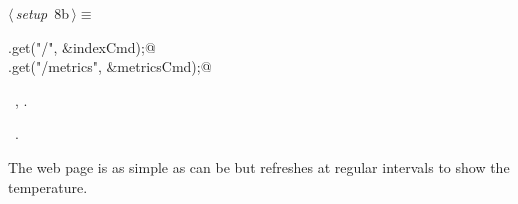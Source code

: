 \documentclass[a4paper, 11pt]{article}
\begin{document}
\begin{flushleft} \small
\begin{minipage}{\linewidth}\label{scrap10}\raggedright\small
{}$\langle\,${\itshape setup}\nobreak\ {\footnotesize{8b}}$\,\rangle\equiv$
\vspace{-1ex}
\begin{list}{}{\setlength{\leftmargin}{1em}} \item
\mbox{}\lstinline@app.get("/", &indexCmd);@\\
\mbox{}\lstinline@app.get("/metrics", &metricsCmd);@\\
\mbox{}{\NWsep}
\end{list}
\vspace{-1ex}
\vspace{-1ex}
\footnotesize
\begin{list}{}{\setlength{\itemsep}{-\parsep}\setlength{\itemindent}{-\leftmargin}}
\item \NWtxtMacroDefBy\ , .
\item \NWtxtMacroRefIn\ .
\end{list}
\end{minipage}
\end{flushleft}

The web page is as simple as can be but refreshes at regular intervals to show the temperature.
\end{document}
